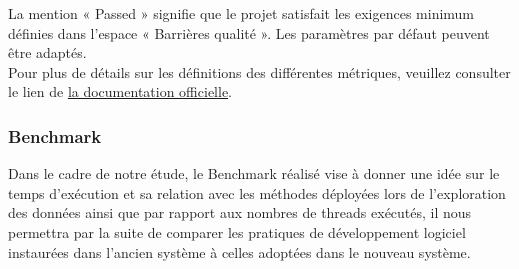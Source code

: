 La mention « Passed » signifie que le projet satisfait les exigences minimum définies dans l’espace « Barrières qualité ». Les paramètres par défaut peuvent être adaptés.\\
Pour plus de détails sur les définitions des différentes métriques, veuillez consulter le lien de \href{https://docs.sonarqube.org/latest/user-guide/metric-definitions/}{la documentation officielle}.

\subsubsection{Benchmark}
Dans le cadre de notre étude, le Benchmark réalisé vise à donner une idée sur le temps d'exécution et sa relation avec les méthodes déployées lors de l'exploration des données ainsi que par rapport aux nombres de threads exécutés, il nous permettra par la suite de comparer les pratiques de développement logiciel instaurées dans l'ancien système à celles adoptées dans le nouveau système.\\

